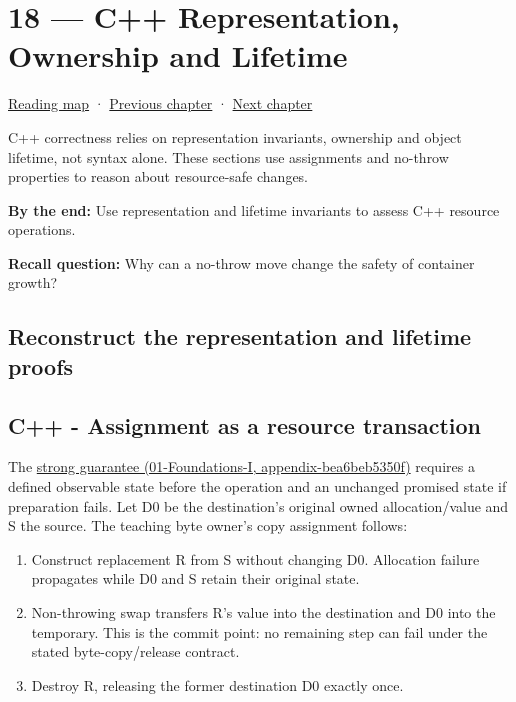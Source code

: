 \hypertarget{03-visual-computing-i-ch018}{}
\chapter{18 --- C++ Representation, Ownership and Lifetime}\label{03-visual-computing-i-ch018-c-representation-ownership-and-lifetime}

\hyperref[volume-reading-map]{Reading map} · \hyperref[03-visual-computing-i-ch017]{Previous chapter} · \hyperref[03-visual-computing-i-ch019]{Next chapter}

C++ correctness relies on representation invariants, ownership and object lifetime, not syntax alone. These sections use assignments and no-throw properties to reason about resource-safe changes.

\textbf{By the end:} Use representation and lifetime invariants to assess C++ resource operations.

\textbf{Recall question:} Why can a no-throw move change the safety of container growth?

\section{Reconstruct the representation and lifetime proofs}\label{03-visual-computing-i-ch018-reconstruct-the-representation-and-lifetime-proofs}

\section{C++ - Assignment as a resource transaction}\label{03-visual-computing-i-ch018-c---assignment-as-a-resource-transaction}

The \href{../01-Foundations-I/main.pdf\#nameddest=appendix-bea6beb5350f}{strong guarantee (01-Foundations-I, appendix-bea6beb5350f)} requires a defined observable state before the operation and an unchanged promised state if preparation fails. Let D0 be the destination's original owned allocation/value and S the source. The teaching byte owner's copy assignment follows:

\begin{enumerate}
\def\labelenumi{\arabic{enumi}.}
\tightlist
\item
  Construct replacement R from S without changing D0. Allocation failure propagates while D0 and S retain their original state.
\item
  Non-throwing swap transfers R's value into the destination and D0 into the temporary. This is the commit point: no remaining step can fail under the stated byte-copy/release contract.
\item
  Destroy R, releasing the former destination D0 exactly once.
\end{enumerate}

